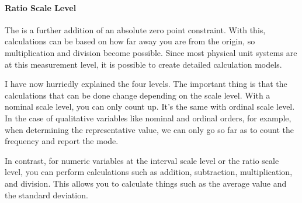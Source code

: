 \documentclass{ltjsbook}
\begin{document}
\paragraph{Ratio Scale Level} The  is a further addition of an absolute zero point constraint. With this, calculations can be based on how far away you are from the origin, so multiplication and division become possible. Since most physical unit systems are at this measurement level, it is possible to create detailed calculation models.

I have now hurriedly explained the four levels. The important thing is that the calculations that can be done change depending on the scale level. With a nominal scale level, you can only count up. It's the same with ordinal scale level. In the case of qualitative variables like nominal and ordinal orders, for example, when determining the representative value, we can only go so far as to count the frequency and report the mode.

In contrast, for numeric variables at the interval scale level or the ratio scale level, you can perform calculations such as addition, subtraction, multiplication, and division. This allows you to calculate things such as the average value and the standard deviation.
\end{document}

